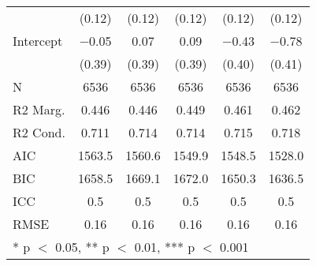 \begin{tabular}[t]{lccccc}
& (\num{0.12})   & (\num{0.12})   & (\num{0.12})   & (\num{0.12})   & (\num{0.12})   \\
Intercept                            & \num{-0.05}    & \num{0.07}     & \num{0.09}     & \num{-0.43}    & \num{-0.78}   \\
& (\num{0.39})   & (\num{0.39})   & (\num{0.39})   & (\num{0.40})   & (\num{0.41})   \\
\midrule
N                                & \num{6536}     & \num{6536}     & \num{6536}     & \num{6536}     & \num{6536}     \\
R2 Marg.                                & \num{0.446}    & \num{0.446}    & \num{0.449}    & \num{0.461}    & \num{0.462}    \\
R2 Cond.                                & \num{0.711}    & \num{0.714}    & \num{0.714}    & \num{0.715}    & \num{0.718}    \\
AIC                                     & \num{1563.5}   & \num{1560.6}   & \num{1549.9}   & \num{1548.5}   & \num{1528.0}   \\
BIC                                     & \num{1658.5}   & \num{1669.1}   & \num{1672.0}   & \num{1650.3}   & \num{1636.5}   \\
ICC                                     & \num{0.5}      & \num{0.5}      & \num{0.5}      & \num{0.5}      & \num{0.5}      \\
RMSE                                    & \num{0.16}     & \num{0.16}     & \num{0.16}     & \num{0.16}     & \num{0.16}     \\
\bottomrule
\multicolumn{6}{l}{\rule{0pt}{1em}* p $<$ 0.05, ** p $<$ 0.01, *** p $<$ 0.001}\\
\end{tabular}
